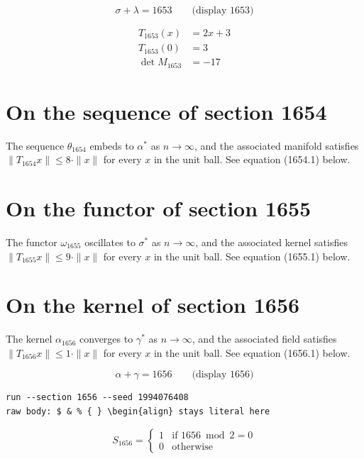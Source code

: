 \documentclass{article}
\begin{document}
$$
\sigma + \lambda = 1653 \qquad \text{(display 1653)}
$$

\begin{align}
T_{1653}(x) &= 2 x + 3 \\
T_{1653}(0) &= 3 \\
\det M_{1653} &= -17
\end{align}

\section{On the sequence of section 1654}
The sequence $\theta_{1654}$ embeds to $\alpha^{*}$ as $n \to \infty$,
and the associated manifold satisfies $\|T_{1654} x\| \leq 8 \cdot \|x\|$
for every $x$ in the unit ball. See equation (1654.1) below.

\section{On the functor of section 1655}
The functor $\omega_{1655}$ oscillates to $\sigma^{*}$ as $n \to \infty$,
and the associated kernel satisfies $\|T_{1655} x\| \leq 9 \cdot \|x\|$
for every $x$ in the unit ball. See equation (1655.1) below.

\section{On the kernel of section 1656}
The kernel $\alpha_{1656}$ converges to $\gamma^{*}$ as $n \to \infty$,
and the associated field satisfies $\|T_{1656} x\| \leq 1 \cdot \|x\|$
for every $x$ in the unit ball. See equation (1656.1) below.

$$
\alpha + \gamma = 1656 \qquad \text{(display 1656)}
$$

\begin{verbatim}
run --section 1656 --seed 1994076408
raw body: $ & % { } \begin{align} stays literal here
\end{verbatim}

\begin{equation}
S_{1656} = \begin{cases} 1 & \text{if } 1656 \bmod 2 = 0 \\ 0 & \text{otherwise} \end{cases}
\end{equation}
\end{document}
